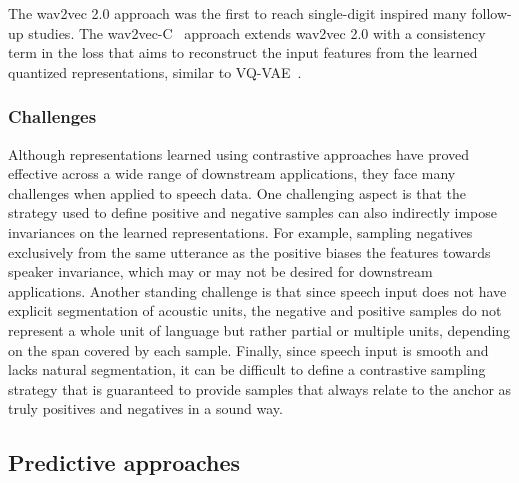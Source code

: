 The wav2vec 2.0 approach was the first to reach single-digit  inspired many follow-up studies. The wav2vec-C~\cite{sadhu21_interspeech} approach extends wav2vec 2.0 with a consistency term in the loss that aims to reconstruct the input features from the learned quantized representations, similar to VQ-VAE~\cite{VQVAE2}.


\subsubsection{Challenges}
Although representations learned using contrastive approaches have proved effective across a wide range of downstream applications, they face many challenges when applied to speech data. 
One challenging aspect is that the strategy used to define positive and negative samples can also indirectly impose invariances on the learned representations. For example, sampling negatives exclusively from the same utterance as the positive biases the features towards speaker invariance, which may or may not be desired for downstream applications. 
Another standing challenge is that since speech input does not have explicit segmentation of acoustic units, the negative and positive samples do not represent a whole unit of language but rather partial or multiple units, depending on the span covered by each sample. 
Finally, since speech input is smooth and lacks natural segmentation, it can be difficult to define a contrastive sampling strategy that is guaranteed to provide samples that always relate to the anchor as truly positives and negatives in a sound way.

\subsection{Predictive approaches}
\label{predictive_approaches}
